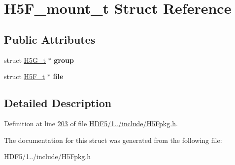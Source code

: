 \hypertarget{struct_h5_f__mount__t}{}\section{H5\+F\+\_\+mount\+\_\+t Struct Reference}
\label{struct_h5_f__mount__t}
\subsection*{Public Attributes}
\begin{DoxyCompactItemize}
\item 
\mbox{\label{struct_h5_f__mount__t_a3fc7816ee26f07f9a967a8b46df83da0}} 
struct \hyperlink{struct_h5_g__t}{H5\+G\+\_\+t} $\ast$ {\bfseries group}
\item 
\mbox{\label{struct_h5_f__mount__t_a545684e740dbff059f417e0997a524da}} 
struct \hyperlink{struct_h5_f__t}{H5\+F\+\_\+t} $\ast$ {\bfseries file}
\end{DoxyCompactItemize}


\subsection{Detailed Description}


Definition at line \hyperlink{_h_d_f5_21_810_81_2include_2_h5_fpkg_8h_source_l00203}{203} of file \hyperlink{_h_d_f5_21_810_81_2include_2_h5_fpkg_8h_source}{H\+D\+F5/1../include/\+H5\+Fpkg.\+h}.



The documentation for this struct was generated from the following file\+:\begin{DoxyCompactItemize}
\item 
H\+D\+F5/1../include/\+H5\+Fpkg.\+h\end{DoxyCompactItemize}
